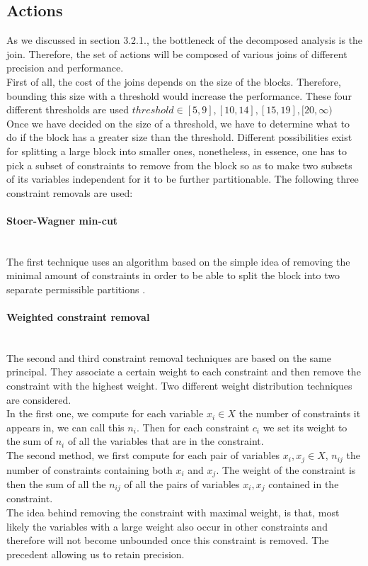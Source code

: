 \subsection{Actions}
As we discussed in section 3.2.1., the bottleneck of the decomposed analysis is the join. Therefore, the set of actions will be composed of various joins of different precision and performance.\\
First of all, the cost of the joins depends on the size of the blocks. Therefore, bounding this size with a threshold would increase the performance. These four different thresholds are used $threshold \in [5,9],[10,14],[15,19],[20,\infty)$\\
Once we have decided on the size of a threshold, we have to determine what to do if the block has a greater size than the threshold. Different possibilities exist for splitting a large block into smaller ones, nonetheless, in essence, one has to pick a subset of constraints to remove from the block so as to make two subsets of its variables independent for it to be further partitionable. The following three constraint removals are used:
\paragraph{Stoer-Wagner min-cut}\mbox{}\\
The first technique uses an algorithm based on the simple idea of removing the minimal amount of constraints in order to be able to split the block into two separate permissible partitions \cite{stoer1997simple}.
\paragraph{Weighted constraint removal}\mbox{}\\
The second and third constraint removal techniques are based on the same principal. They associate a certain weight to each constraint and then remove the constraint with the highest weight. Two different weight distribution techniques are considered. \\
In the first one, we compute for each variable $x_i \in X$ the number of constraints it appears in, we can call this $n_i$. Then for each constraint $c_i$ we set its weight to the sum of $n_i$ of all the variables that are in the constraint.\\
The second method, we first compute for each pair of variables $x_i,x_j\in X$, $n_{ij}$ the number of constraints containing both $x_i$ and $x_j$. The weight of the constraint is then the sum of all the $n_{ij}$ of all the pairs of variables $x_i,x_j$ contained in the constraint.\\
The idea behind removing the constraint with maximal weight, is that, most likely the variables with a large weight also occur in other constraints and therefore will not become unbounded once this constraint is removed. The precedent allowing us to retain precision.
